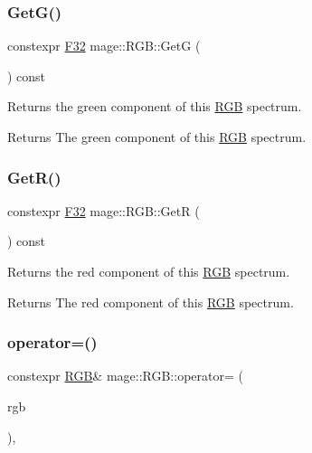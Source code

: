 \subsubsection{\texorpdfstring{Get\+G()}{GetG()}}
{\footnotesize\ttfamily constexpr \mbox{\hyperlink{namespacemage_aa97e833b45f06d60a0a9c4fc22ae02c0}{F32}} mage\+::\+R\+G\+B\+::\+GetG (\begin{DoxyParamCaption}{ }\end{DoxyParamCaption}) const\hspace{0.3cm}{\ttfamily [noexcept]}}

Returns the green component of this \mbox{\hyperlink{structmage_1_1_r_g_b}{R\+GB}} spectrum.

\begin{DoxyReturn}{Returns}
The green component of this \mbox{\hyperlink{structmage_1_1_r_g_b}{R\+GB}} spectrum. 
\end{DoxyReturn}
\mbox{\label{structmage_1_1_r_g_b_a314530cf81692c9f49da663ba51ea528}} 
\subsubsection{\texorpdfstring{Get\+R()}{GetR()}}
{\footnotesize\ttfamily constexpr \mbox{\hyperlink{namespacemage_aa97e833b45f06d60a0a9c4fc22ae02c0}{F32}} mage\+::\+R\+G\+B\+::\+GetR (\begin{DoxyParamCaption}{ }\end{DoxyParamCaption}) const\hspace{0.3cm}{\ttfamily [noexcept]}}

Returns the red component of this \mbox{\hyperlink{structmage_1_1_r_g_b}{R\+GB}} spectrum.

\begin{DoxyReturn}{Returns}
The red component of this \mbox{\hyperlink{structmage_1_1_r_g_b}{R\+GB}} spectrum. 
\end{DoxyReturn}
\mbox{\label{structmage_1_1_r_g_b_ad78ad1a23b801b19a0e8f747dec8637d}} 
\subsubsection{\texorpdfstring{operator=()}{operator=()}\hspace{0.1cm}{\footnotesize\ttfamily [1/2]}}
{\footnotesize\ttfamily constexpr \mbox{\hyperlink{structmage_1_1_r_g_b}{R\+GB}}\& mage\+::\+R\+G\+B\+::operator= (\begin{DoxyParamCaption}\item[{const \mbox{\hyperlink{structmage_1_1_r_g_b}{R\+GB}} \&}]{rgb }\end{DoxyParamCaption})\hspace{0.3cm}{\ttfamily [default]}, {\ttfamily [noexcept]}}

